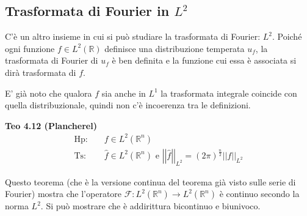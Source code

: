 \documentclass{article}
\begin{document}
\subsection{Trasformata di Fourier in $L^{2}$}

C'\`{e} un altro insieme in cui si pu\`{o} studiare la trasformata di
Fourier: $L^{2}$. Poich\'{e} ogni funzione $f\in L^{2}\left( 
\mathbb{R}
\right) $ definisce una distribuzione temperata $u_{f}$, la trasformata di
Fourier di $u_{f}$ \`{e} ben definita e la funzione cui essa \`{e} associata
si dir\`{a} trasformata di $f$.


E' gi\`{a} noto che qualora $f$ sia anche in $L^{1}$ la trasformata
integrale coincide con quella distribuzionale, quindi non c'\`{e} incoerenza
tra le definizioni.

\textbf{Teo 4.12 (Plancherel)}%
\begin{eqnarray*}
\text{Hp}\text{: } &&f\in L^{2}\left( 
\mathbb{R}
^{n}\right) \\
\text{Ts}\text{: } &&\hat{f}\in L^{2}\left( 
\mathbb{R}
^{n}\right) \text{ e }\left\vert \left\vert \hat{f}\right\vert \right\vert
_{L^{2}}=\left( 2\pi \right) ^{\frac{n}{2}}\left\vert \left\vert
f\right\vert \right\vert _{L^{2}}
\end{eqnarray*}

Questo teorema (che \`{e} la versione continua del teorema gi\`{a} visto
sulle serie di Fourier) mostra che l'operatore $\mathcal{F}:L^{2}\left( 
\mathbb{R}
^{n}\right) \rightarrow L^{2}\left( 
\mathbb{R}
^{n}\right) $ \`{e} continuo secondo la norma $L^{2}$. Si pu\`{o} mostrare
che \`{e} addirittura bicontinuo e biunivoco.
\end{document}
